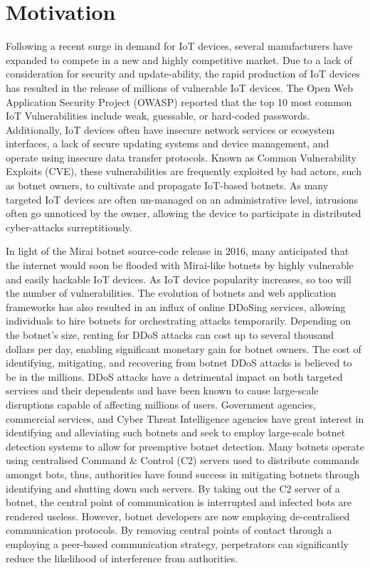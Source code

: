 \section{Motivation}

Following a recent surge in demand for IoT devices, several manufacturers have expanded to compete in a new and highly competitive market. Due to a lack of consideration for security and update-ability, the rapid production of IoT devices has resulted in the release of millions of vulnerable IoT devices. The Open Web Application Security Project (OWASP) reported that the top 10 most common IoT Vulnerabilities include weak, guessable, or hard-coded passwords. Additionally, IoT devices often have insecure network services or ecosystem interfaces, a lack of secure updating systems and device management, and operate using insecure data transfer protocols. \citep{Misra2021} Known as Common Vulnerability Exploits (CVE), these vulnerabilities are frequently exploited by bad actors, such as botnet owners, to cultivate and propagate IoT-based botnets. As many targeted IoT devices are often un-managed on an administrative level, intrusions often go unnoticed by the owner, allowing the device to participate in distributed cyber-attacks surreptitiously. 

In light of the Mirai botnet source-code release in 2016, many anticipated that the internet would soon be flooded with Mirai-like botnets by highly vulnerable and easily hackable IoT devices. \citep{Krebs2016} As IoT device popularity increases, so too will the number of vulnerabilities. The evolution of botnets and web application frameworks has also resulted in an influx of online DDoSing services, allowing individuals to hire botnets for orchestrating attacks temporarily. Depending on the botnet's size, renting for DDoS attacks can cost up to several thousand dollars per day, enabling significant monetary gain for botnet owners. \citep{Putman2018} The cost of identifying, mitigating, and recovering from botnet DDoS attacks is believed to be in the millions. DDoS attacks have a detrimental impact on both targeted services and their dependents and have been known to cause large-scale disruptions capable of affecting millions of users. Government agencies, commercial services, and Cyber Threat Intelligence agencies have great interest in identifying and alleviating such botnets and seek to employ large-scale botnet detection systems to allow for preemptive botnet detection. Many botnets operate using centralised Command \& Control (C2) servers used to distribute commands amongst bots, thus, authorities have found success in mitigating botnets through identifying and shutting down such servers. By taking out the C2 server of a botnet, the central point of communication is interrupted and infected bots are rendered useless. However, botnet developers are now employing de-centralised communication protocols. By removing central points of contact through a employing a peer-based communication strategy, perpetrators can significantly reduce the likelihood of interference from authorities. 

